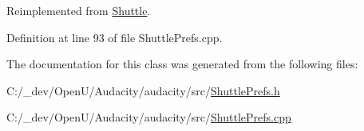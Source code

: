 Reimplemented from \hyperlink{class_shuttle_a4159e8ac5790878b1af7275e35f5e841}{Shuttle}.



Definition at line 93 of file Shuttle\+Prefs.\+cpp.



The documentation for this class was generated from the following files\+:\begin{DoxyCompactItemize}
\item 
C\+:/\+\_\+dev/\+Open\+U/\+Audacity/audacity/src/\hyperlink{_shuttle_prefs_8h}{Shuttle\+Prefs.\+h}\item 
C\+:/\+\_\+dev/\+Open\+U/\+Audacity/audacity/src/\hyperlink{_shuttle_prefs_8cpp}{Shuttle\+Prefs.\+cpp}\end{DoxyCompactItemize}
